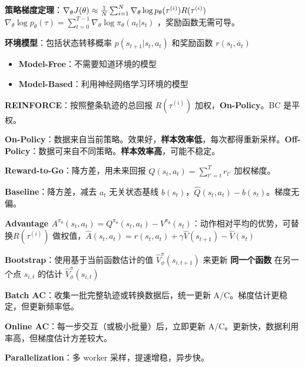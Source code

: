 \documentclass[
  8pt]{extarticle}
\providecommand{\tightlist}{%
  \setlength{\itemsep}{0pt}\setlength{\parskip}{0pt}}
\begin{document}
\begin{multicols*}{4}
\textbf{策略梯度定理}：\(\nabla_\theta J(\theta) \approx \frac{1}{N} \sum_{i=1}^{N} \nabla_\theta \log p_\theta(\tau^{(i)}) R(\tau^{(i)})\\\)
\(\nabla_\theta \log p_\theta(\tau) = \sum_{t=0}^{T-1} \nabla_\theta \log \pi_\theta(a_t | s_t)\)
，奖励函数无需可导。

\textbf{环境模型}：包括状态转移概率 \(p(s_{t+1} | s_t, a_t)\) 和奖励函数
\(r(s_t, a_t)\)

\begin{itemize}
\tightlist
\item
  \textbf{Model-Free}：不需要知道环境的模型
\item
  \textbf{Model-Based}：利用神经网络学习环境的模型
\end{itemize}

\textbf{REINFORCE}：按照整条轨迹的总回报 \(R(\tau^{(i)})\)
加权，\textbf{On-Policy}。BC 是平权。

\textbf{On-Policy}：数据来自当前策略。效果好，\textbf{样本效率低}，每次都得重新采样。\textbf{Off-Policy}：数据可来自不同策略。\textbf{样本效率高}，可能不稳定。

\textbf{Reward-to-Go}：降方差，用未来回报
\(\hat{Q}(s_t, a_t) = \sum_{t'=t}^{T} r_{t'}\) 加权梯度。

\textbf{Baseline}：降方差，减去 \(a_t\) 无关状态基线
\(b(s_t)\)，\(\hat{Q}(s_t, a_t) - b(s_t)\)。梯度无偏。

\textbf{Advantage
\(A^{\pi_\theta}(s_t, a_t) = Q^{\pi_\theta}(s_t, a_t) - V^{\pi_\theta}(s_t)\)}：动作相对平均的优势，可替换\(R(\tau^{(i)})\)
做权值，\(\hat{A}(s_t, a_t) = r(s_t, a_t) + \gamma \hat{V}(s_{t+1}) - \hat{V}(s_t)\)

\textbf{Bootstrap}：使用基于当前函数估计的值
\(\hat{V}_{\phi}^{\pi}(s_{i,t+1})\) 来更新 \textbf{同一个函数}
在另一个点 \(s_{i,t}\) 的估计 \(\hat{V}_{\phi}^{\pi}(s_{i,t})\)

\textbf{Batch AC}：收集一批完整轨迹或转换数据后，统一更新
A/C。梯度估计更稳定，但更新频率低。

\textbf{Online AC}：每一步交互（或极小批量）后，立即更新
A/C。更新快，数据利用率高，但梯度估计方差较大。

\textbf{Parallelization}：多 worker 采样，提速增稳，异步快。

\end{multicols*}
\end{document}
